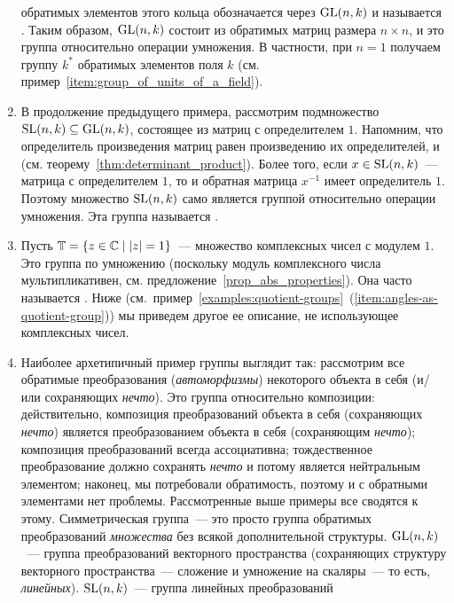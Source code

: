 \begin{examples}
\begin{enumerate}
  обратимых элементов этого кольца обозначается через $\operatorname{GL}(n,k)$ и
  называется . Таким образом, $\operatorname{GL}(n,k)$ состоит из обратимых матриц
  размера $n\times n$, и это группа относительно операции умножения.
  В частности, при $n=1$ получаем группу $k^*$ обратимых элементов
  поля $k$ (см. пример~\ref{item:group_of_units_of_a_field}).
\item\label{item:special_linear_example} В продолжение предыдущего
  примера, рассмотрим подмножество
  $\operatorname{SL}(n,k)\subseteq\operatorname{GL}(n,k)$, состоящее из матриц с определителем
  $1$. Напомним, что определитель произведения матриц равен
  произведению их определителей, и
  (см. теорему~\ref{thm:determinant_product}). Более того, если
  $x\in\operatorname{SL}(n,k)$~--- матрица с определителем $1$, то и обратная
  матрица $x^{-1}$ имеет определитель $1$. Поэтому
  множество $\operatorname{SL}(n,k)$ само является группой относительно операции
  умножения. Эта группа называется .
\item\label{item:group_of_angles}
  Пусть $\mathbb T = \{z\in\mathbb C\mid |z| = 1\}$~--- множество
  комплексных чисел с модулем $1$. Это группа по умножению
  (поскольку модуль комплексного числа мультипликативен,
  см. предложение~\ref{prop_abs_properties}).
  Она часто называется .
  Ниже
  (см.~пример~\ref{examples:quotient-groups}~(\ref{item:angles-as-quotient-group}))
  мы приведем другое ее описание, не использующее
  комплексных чисел.
\item\label{item:geometric_groups} Наиболее архетипичный пример группы
  выглядит так: рассмотрим все обратимые преобразования
  ({\it автоморфизмы}) некоторого объекта в себя (и/или сохраняющих
  {\it нечто}). Это группа
  относительно композиции: действительно, композиция преобразований
  объекта в себя (сохраняющих {\it нечто}) является преобразованием
  объекта в себя (сохраняющим {\it нечто}); композиция преобразований
  всегда ассоциативна; тождественное преобразование должно сохранять
  {\it нечто} и потому является нейтральным элементом; наконец, мы
  потребовали обратимость, поэтому и с обратными элементами нет
  проблемы. Рассмотренные выше примеры все сводятся к
  этому. Симметрическая группа~--- это просто группа обратимых
  преобразований {\it множества} без всякой дополнительной
  структуры. $\operatorname{GL}(n,k)$~--- группа преобразований векторного
  пространства (сохраняющих структуру векторного пространства~---
  сложение и умножение на скаляры~--- то есть,
  {\it линейных}). $\operatorname{SL}(n,k)$~--- группа линейных преобразований

\end{enumerate}
\end{examples}

